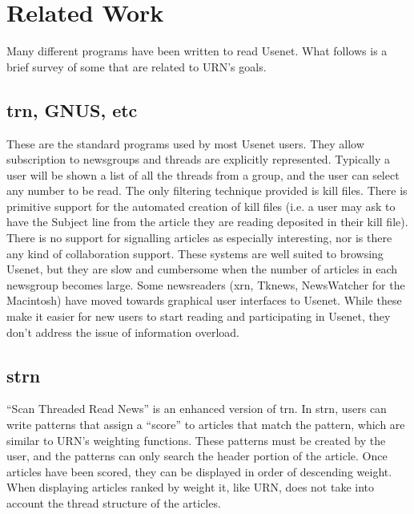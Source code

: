 
\section{Related Work}

Many different programs have been written to read Usenet. What follows is a
brief survey of some that are related to URN's goals.

\subsection{trn, GNUS, etc}

These are the standard programs used by most Usenet users. They allow
subscription to newsgroups and threads are explicitly represented. Typically a
user will be shown a list of all the threads from a group, and the user can
select any number to be read. The only filtering technique provided is kill
files. There is primitive support for the automated creation of kill files
(i.e. a user may ask to have the Subject line from the article they are reading
deposited in their kill file). There is no support for signalling articles as
especially interesting, nor is there any kind of collaboration support. These
systems are well suited to browsing Usenet, but they are slow and cumbersome
when the number of articles in each newsgroup becomes large. Some newsreaders
(xrn, Tknews, NewsWatcher for the Macintosh) have moved towards graphical user
interfaces to Usenet. While these make it easier for new users to start reading
and participating in Usenet, they don't address the issue of information
overload.

\subsection{strn}

``Scan Threaded Read News'' is an enhanced version of trn. In strn, users can
write patterns that assign a ``score'' to articles that match the pattern,
which are similar to URN's weighting functions.  These patterns must be created
by the user, and the patterns can only search the header portion of the
article. Once articles have been scored, they can be displayed in order of
descending weight. When displaying articles ranked by weight it, like URN, does
not take into account the thread structure of the articles.

